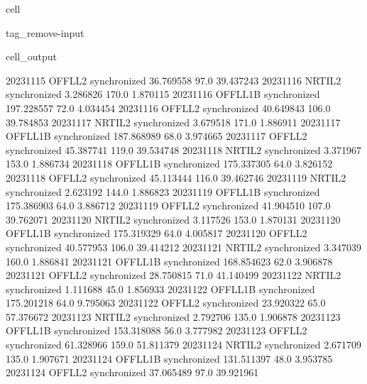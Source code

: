 \documentclass[letterpaper,10pt,english]{jupyterBook}
\begin{document}
\begin{sphinxuseclass}{cell}
\begin{sphinxuseclass}{tag_remove-input}
\begin{sphinxVerbatimOutput}
\begin{sphinxuseclass}{cell_output}
\begin{sphinxVerbatim}[commandchars=\\\{\}]
2023\PYGZhy{}11\PYGZhy{}15      OFFL\PYGZus{}L2  synchronized   36.769558    97.0   39.437243
2023\PYGZhy{}11\PYGZhy{}16      NRTI\PYGZus{}L2  synchronized    3.286826   170.0    1.870115
2023\PYGZhy{}11\PYGZhy{}16     OFFL\PYGZus{}L1B  synchronized  197.228557    72.0    4.034454
2023\PYGZhy{}11\PYGZhy{}16      OFFL\PYGZus{}L2  synchronized   40.649843   106.0   39.784853
2023\PYGZhy{}11\PYGZhy{}17      NRTI\PYGZus{}L2  synchronized    3.679518   171.0    1.886911
2023\PYGZhy{}11\PYGZhy{}17     OFFL\PYGZus{}L1B  synchronized  187.868989    68.0    3.974665
2023\PYGZhy{}11\PYGZhy{}17      OFFL\PYGZus{}L2  synchronized   45.387741   119.0   39.534748
2023\PYGZhy{}11\PYGZhy{}18      NRTI\PYGZus{}L2  synchronized    3.371967   153.0    1.886734
2023\PYGZhy{}11\PYGZhy{}18     OFFL\PYGZus{}L1B  synchronized  175.337305    64.0    3.826152
2023\PYGZhy{}11\PYGZhy{}18      OFFL\PYGZus{}L2  synchronized   45.113444   116.0   39.462746
2023\PYGZhy{}11\PYGZhy{}19      NRTI\PYGZus{}L2  synchronized    2.623192   144.0    1.886823
2023\PYGZhy{}11\PYGZhy{}19     OFFL\PYGZus{}L1B  synchronized  175.386903    64.0    3.886712
2023\PYGZhy{}11\PYGZhy{}19      OFFL\PYGZus{}L2  synchronized   41.904510   107.0   39.762071
2023\PYGZhy{}11\PYGZhy{}20      NRTI\PYGZus{}L2  synchronized    3.117526   153.0    1.870131
2023\PYGZhy{}11\PYGZhy{}20     OFFL\PYGZus{}L1B  synchronized  175.319329    64.0    4.005817
2023\PYGZhy{}11\PYGZhy{}20      OFFL\PYGZus{}L2  synchronized   40.577953   106.0   39.414212
2023\PYGZhy{}11\PYGZhy{}21      NRTI\PYGZus{}L2  synchronized    3.347039   160.0    1.886841
2023\PYGZhy{}11\PYGZhy{}21     OFFL\PYGZus{}L1B  synchronized  168.854623    62.0    3.906878
2023\PYGZhy{}11\PYGZhy{}21      OFFL\PYGZus{}L2  synchronized   28.750815    71.0   41.140499
2023\PYGZhy{}11\PYGZhy{}22      NRTI\PYGZus{}L2  synchronized    1.111688    45.0    1.856933
2023\PYGZhy{}11\PYGZhy{}22     OFFL\PYGZus{}L1B  synchronized  175.201218    64.0    9.795063
2023\PYGZhy{}11\PYGZhy{}22      OFFL\PYGZus{}L2  synchronized   23.920322    65.0   57.376672
2023\PYGZhy{}11\PYGZhy{}23      NRTI\PYGZus{}L2  synchronized    2.792706   135.0    1.906878
2023\PYGZhy{}11\PYGZhy{}23     OFFL\PYGZus{}L1B  synchronized  153.318088    56.0    3.777982
2023\PYGZhy{}11\PYGZhy{}23      OFFL\PYGZus{}L2  synchronized   61.328966   159.0   51.811379
2023\PYGZhy{}11\PYGZhy{}24      NRTI\PYGZus{}L2  synchronized    2.671709   135.0    1.907671
2023\PYGZhy{}11\PYGZhy{}24     OFFL\PYGZus{}L1B  synchronized  131.511397    48.0    3.953785
2023\PYGZhy{}11\PYGZhy{}24      OFFL\PYGZus{}L2  synchronized   37.065489    97.0   39.921961

\end{sphinxVerbatim}
\end{sphinxuseclass}
\end{sphinxVerbatimOutput}
\end{sphinxuseclass}
\end{sphinxuseclass}
\end{document}
